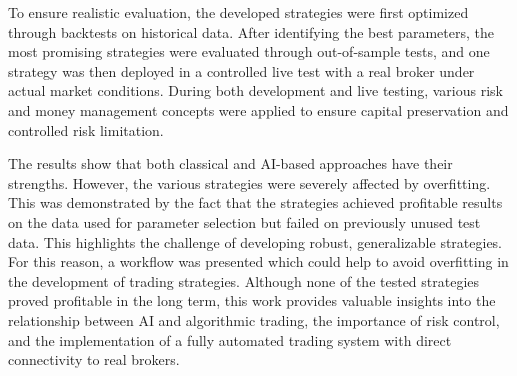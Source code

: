 To ensure realistic evaluation, the developed strategies were first optimized through backtests on historical data.
After identifying the best parameters, the most promising strategies were evaluated through out-of-sample tests, and one strategy was then deployed in a controlled live test with a real broker under actual market conditions.
During both development and live testing, various risk and money management concepts were applied to ensure capital preservation and controlled risk limitation.


The results show that both classical and AI-based approaches have their strengths.
However, the various strategies were severely affected by overfitting.
This was demonstrated by the fact that the strategies achieved profitable results on the data used for parameter selection but failed on previously unused test data.
This highlights the challenge of developing robust, generalizable strategies.
For this reason, a workflow was presented which could help to avoid overfitting in the development of trading strategies.
Although none of the tested strategies proved profitable in the long term, this work provides valuable insights into the relationship between AI and algorithmic trading, the importance of risk control, and the implementation of a fully automated trading system with direct connectivity to real brokers.


